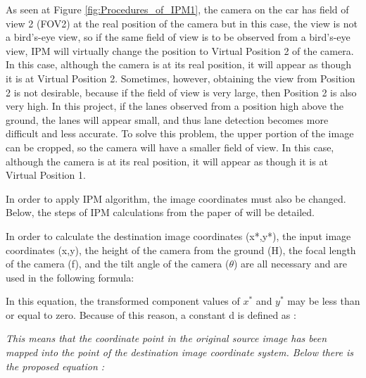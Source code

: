  As seen at Figure \ref{fig:Procedures_of_IPM1}, the camera on the car has field of view 2 (FOV2) at the real position of the camera but in this case, the view is not a bird's-eye view, so if the same field of view is to be observed from a bird's-eye view, IPM will virtually change the position to Virtual Position 2 of the camera. In this case, although the camera is at its real position, it will appear as though it is at Virtual Position 2. Sometimes, however, obtaining the view from Position 2 is not desirable, because if the field of view is very large, then Position 2 is also very high. In this project, if the lanes observed from a position high above the ground, the lanes will appear small, and thus lane detection becomes more difficult and less accurate. To solve this problem, the upper portion of the image can be cropped, so the camera will have a smaller field of view. In this case, although the camera is at its real position, it will appear as though it is at Virtual Position 1.
  
In order to apply IPM algorithm, the image coordinates must also be changed. Below, the steps of IPM calculations from the paper of \cite{IPM} will be detailed.


In order to calculate the destination image coordinates (x*,y*), the input image coordinates (x,y), the height of the camera from the ground (H), the focal length of the camera (f), and the tilt angle of the camera ($\theta$) are all necessary and are used in the following formula\cite{IPM}:
 
\begin{center}
\end{center}

In this equation, the transformed component values of $x^*$ and $y^*$ may be less than or equal to zero. Because of 
this reason, a constant d is defined as\cite{IPM} :
 \begin{center}
\end{center}

\emph{\color{green}This means that the coordinate point in the original source image has been mapped into the point of the destination image coordinate system. Below there is the proposed equation :}
 

